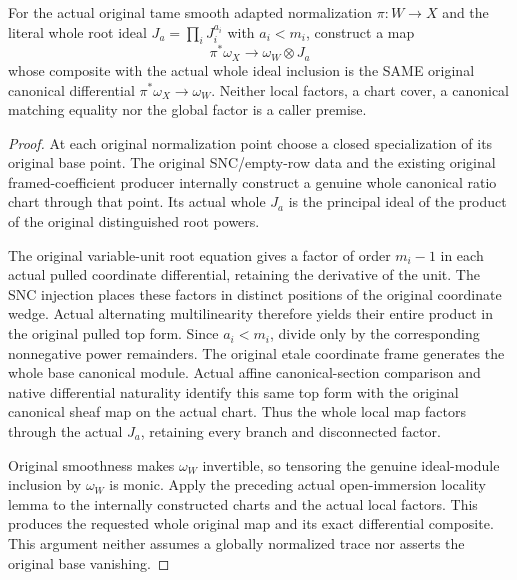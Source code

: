 \begin{theorem}
\label{thm:kn-nadel-original-bounded-canonical-sheaf-factor}
\leanok
For the actual original tame smooth adapted normalization $\pi:W\to X$
and the literal whole root ideal $J_a=\prod_iJ_i^{a_i}$ with $a_i<m_i$,
construct a map
\[
 \pi^*\omega_X\longrightarrow\omega_W\otimes J_a
\]
whose composite with the actual whole ideal inclusion is the SAME original
canonical differential $\pi^*\omega_X\to\omega_W$. Neither local factors,
a chart cover, a canonical matching equality nor the global factor is a
caller premise.
\end{theorem}
\begin{proof}
At each original normalization point choose a closed specialization of its
original base point. The original SNC/empty-row data and the existing
original framed-coefficient producer internally construct a genuine whole
canonical ratio chart through that point. Its actual whole $J_a$ is the
principal ideal of the product of the original distinguished root powers.

The original variable-unit root equation gives a factor of order $m_i-1$
in each actual pulled coordinate differential, retaining the derivative
of the unit. The SNC injection places these factors in distinct positions
of the original coordinate wedge. Actual alternating multilinearity
therefore yields their entire product in the original pulled top form.
Since $a_i<m_i$, divide only by the corresponding nonnegative power
remainders. The original etale coordinate frame generates the whole base
canonical module. Actual affine canonical-section comparison and native
differential naturality identify this same top form with the original
canonical sheaf map on the actual chart. Thus the whole local map factors
through the actual $J_a$, retaining every branch and disconnected factor.

Original smoothness makes $\omega_W$ invertible, so tensoring the genuine
ideal-module inclusion by $\omega_W$ is monic. Apply the preceding actual
open-immersion locality lemma to the internally constructed charts and
the actual local factors. This produces the requested whole original
map and its exact differential composite. This argument neither assumes
a globally normalized trace nor asserts the original base vanishing.
\end{proof}
